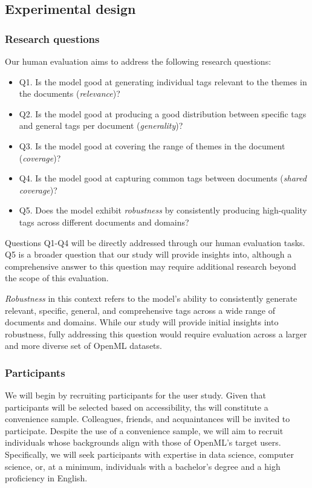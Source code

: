 \subsection{Experimental design}
\subsubsection{Research questions}
Our human evaluation aims to address the following research questions:

\begin{itemize}
\item Q1. Is the model good at generating individual tags relevant to the themes in the documents (\textit{relevance})?
\item Q2. Is the model good at producing a good distribution between specific tags and general tags per document (\textit{generality})?
\item Q3. Is the model good at covering the range of themes in the document (\textit{coverage})?
\item Q4. Is the model good at capturing common tags between documents (\textit{shared coverage})?
\item Q5. Does the model exhibit \textit{robustness} by consistently producing high-quality tags across different documents and domains?
\end{itemize}

Questions Q1-Q4 will be directly addressed through our human evaluation tasks. Q5 is a broader question that our study will provide insights into, although a comprehensive answer to this question may require additional research beyond the scope of this evaluation.

\textit{Robustness} in this context refers to the model's ability to consistently generate relevant, specific, general, and comprehensive tags across a wide range of documents and domains. While our study will provide initial insights into robustness, fully addressing this question would require evaluation across a larger and more diverse set of OpenML datasets.

\subsubsection{Participants}
We will begin by recruiting participants for the user study. Given that participants will be selected based on accessibility, ths will constitute a convenience sample. Colleagues, friends, and acquaintances will be invited to participate. Despite the use of a convenience sample, we will aim to recruit individuals whose backgrounds align with those of OpenML's target users. Specifically, we will seek participants with expertise in data science, computer science, or, at a minimum, individuals with a bachelor's degree and a high proficiency in English.

